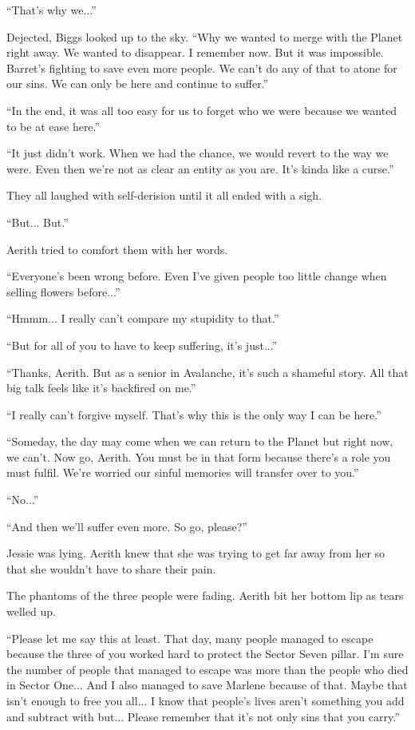 \documentclass[oneside]{book}
\begin{document}
“That's why we...”

Dejected, Biggs looked up to the sky. “Why we wanted to merge with the Planet right away. We wanted to disappear. I remember now. But it was impossible. Barret's fighting to save even more people. We can't do any of that to atone for our sins. We can only be here and continue to suffer.”

“In the end, it was all too easy for us to forget who we were because we wanted to be at ease here.”

“It just didn't work. When we had the chance, we would revert to the way we were. Even then we're not as clear an entity as you are. It's kinda like a curse.”

They all laughed with self-derision until it all ended with a sigh.

“But... But.”

Aerith tried to comfort them with her words.

“Everyone's been wrong before. Even I've given people too little change when selling flowers before...”

“Hmmm... I really can't compare my stupidity to that.”

“But for all of you to have to keep suffering, it's just...”

“Thanks, Aerith. But as a senior in Avalanche, it's such a shameful story. All that big talk feels like it's backfired on me.”

“I really can't forgive myself. That's why this is the only way I can be here.”

“Someday, the day may come when we can return to the Planet but right now, we can't. Now go, Aerith. You must be in that form because there's a role you must fulfil. We're worried our sinful memories will transfer over to you.”

“No...”

“And then we'll suffer even more. So go, please?”

Jessie was lying. Aerith knew that she was trying to get far away from her so that she wouldn't have to share their pain.

The phantoms of the three people were fading. Aerith bit her bottom lip as tears welled up.

“Please let me say this at least. That day, many people managed to escape because the three of you worked hard to protect the Sector Seven pillar. I'm sure the number of people that managed to escape was more than the people who died in Sector One... And I also managed to save Marlene because of that. Maybe that isn't enough to free you all... I know that people's lives aren't something you add and subtract with but... Please remember that it's not only sins that you carry.”
\end{document}
